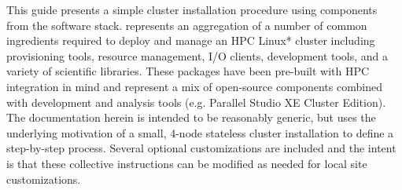 This guide presents a simple cluster installation procedure using components
from the \OHPC{} software stack. \OHPC{} represents an aggregation
of a number of common ingredients required to deploy and manage an HPC Linux*
cluster including provisioning tools, resource management, I/O clients,
development tools, and a variety of scientific libraries. These packages have
been pre-built with HPC integration in mind and represent a mix of open-source
components combined
with \Intel{}\raisebox{0.39ex}{\scriptsize{\textregistered}} development and
analysis tools (e.g. \Intel{} Parallel Studio XE Cluster Edition).  The
documentation herein is intended to be reasonably generic, but uses the
underlying motivation of a small, 4-node stateless cluster installation to
define a step-by-step process. Several optional customizations are included and
the intent is that these collective instructions can be modified as needed for
local site customizations.
